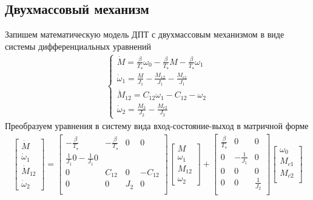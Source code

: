 \subsection{Двухмассовый механизм}
Запишем математическую модель ДПТ с двухмассовым механизмом в виде системы дифференциальных уравнений
\begin{gather*}
    \begin{cases}
        \dot{M} = \frac{\beta}{T_\text{э}}\omega_0-\frac{\beta}{T_\text{э}}M-\frac{\beta}{T_\text{э}}\omega_1\\
        \dot{\omega}_1 = \frac{M}{J_1}-\frac{M_{12}}{J_1}-\frac{M_{c1}}{J_1}\\
        \dot{M}_{12} = C_{12}\omega_1 -C_{12}-\omega_2\\
        \dot{\omega}_2 = \frac{M_2}{J_2}-\frac{M_{c2}}{J_2}
    \end{cases}
\end{gather*}
Преобразуем уравнения в систему вида вход-состояние-выход в матричной форме
\begin{gather*}
    \begin{bmatrix}
        \dot{M} \\
        \dot{\omega}_1\\
        \dot{M}_{12} \\
        \dot{\omega}_2
    \end{bmatrix}
    =
    \begin{bmatrix}
        -\frac{\beta}{T_\text{э}}&-\frac{\beta}{T_\text{э}}&0&0\\
        \frac{1}{J_1} 0 -\frac{1}{J_1} 0 \\
        0&C_{12}&0&-C_{12}\\
        0&0&J_2&0\\
    \end{bmatrix}
    \begin{bmatrix}
        M \\
        \omega_1\\
        M_{12} \\
        \omega_2
    \end{bmatrix}+
    \begin{bmatrix}
        \frac{\beta}{T_\text{э}}&0&0\\
        0 & -\frac{1}{J_1}&0\\
        0&0&0\\
        0&0&\frac{1}{J_2}\\
    \end{bmatrix}
    \begin{bmatrix}
        \omega_0\\
        M_{c1}\\
        M_{c2}\\
    \end{bmatrix}
\end{gather*}

